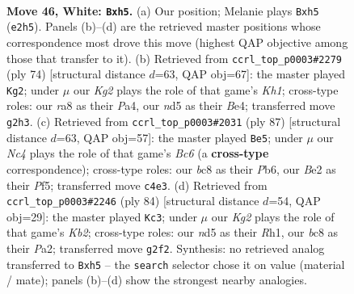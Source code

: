 \documentclass[11pt]{article}
\begin{document}
\clearpage

\begin{figure}[p]\centering
\begin{subfigure}{0.46\textwidth}\centering
\resizebox{\linewidth}{!}{%
\newchessgame
\chessboard[
  setfen={rnb5/1p4k1/4p3/3n1pNp/PpN2P2/1P4P1/4B1KP/7R w - - 0 46},
  showmover=false,
  pgfstyle=straightmove, color=movearrow, markmove={e2-h5}
]}
\caption{}
\end{subfigure}\hfill
\begin{subfigure}{0.46\textwidth}\centering
\resizebox{\linewidth}{!}{%
\newchessgame
\chessboard[
  setfen={7r/p3b3/1p1pN1pk/2pPn3/P1P1B1P1/1P6/8/6RK w - - 1 38},
  showmover=false,
  pgfstyle=straightmove, color=movearrow, markmove={h1-g2}
]}
\caption{}
\end{subfigure}
\\[4pt]
\begin{subfigure}{0.46\textwidth}\centering
\resizebox{\linewidth}{!}{%
\newchessgame
\chessboard[
  setfen={8/6k1/1p2p2p/2n2pp1/PpB5/1Pb1P2P/5PP1/3K1N2 b - - 4 44},
  showmover=false,
  pgfstyle=straightmove, color=movearrow, markmove={c3-e5}
]}
\caption{}
\end{subfigure}\hfill
\begin{subfigure}{0.46\textwidth}\centering
\resizebox{\linewidth}{!}{%
\newchessgame
\chessboard[
  setfen={5kb1/1p5p/p1nr1pp1/8/6P1/1P3P2/PKN1B1P1/7R w - - 0 43},
  showmover=false,
  pgfstyle=straightmove, color=movearrow, markmove={b2-c3}
]}
\caption{}
\end{subfigure}
\caption{\textbf{Move 46, White: \texttt{Bxh5}.} (a) Our position; Melanie plays \texttt{Bxh5} (\texttt{e2h5}). Panels (b)--(d) are the retrieved master positions whose correspondence most drove this move (highest QAP objective among those that transfer to it). (b) Retrieved from \texttt{ccrl\_top\_p0003\#2279} (ply 74) [structural distance $d$=63, QAP obj=67]: the master played \texttt{Kg2}; under $\mu$ our \emph{Kg2} plays the role of that game's \emph{Kh1}; cross-type roles: our \emph{r}a8 as their \emph{P}a4, our \emph{n}d5 as their \emph{B}e4; transferred move \texttt{g2h3}. (c) Retrieved from \texttt{ccrl\_top\_p0003\#2031} (ply 87) [structural distance $d$=63, QAP obj=57]: the master played \texttt{Be5}; under $\mu$ our \emph{Nc4} plays the role of that game's \emph{Bc6} (a \textbf{cross-type} correspondence); cross-type roles: our \emph{b}c8 as their \emph{P}b6, our \emph{B}e2 as their \emph{P}f5; transferred move \texttt{c4e3}. (d) Retrieved from \texttt{ccrl\_top\_p0003\#2246} (ply 84) [structural distance $d$=54, QAP obj=29]: the master played \texttt{Kc3}; under $\mu$ our \emph{Kg2} plays the role of that game's \emph{Kb2}; cross-type roles: our \emph{n}d5 as their \emph{R}h1, our \emph{b}c8 as their \emph{P}a2; transferred move \texttt{g2f2}. Synthesis: no retrieved analog transferred to \texttt{Bxh5} -- the \texttt{search} selector chose it on value (material / mate); panels (b)--(d) show the strongest nearby analogies.}
\label{fig:thought-m90}
\end{figure}
\end{document}

